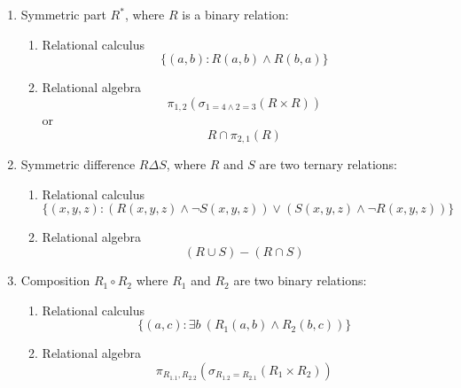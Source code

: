 \begin{enumerate}
  \item Symmetric part $R^*$, where $R$ is a binary relation:
  \begin{enumerate}
    \item Relational calculus
    \begin{equation*}
      \{(a,b) : R(a,b) \wedge R(b,a)\}
    \end{equation*}

    \item Relational algebra
    \begin{equation*}
      \pi_{1,2}(\sigma_{1 = 4 \land 2 = 3}(R \times R))
    \end{equation*}
    or
    \begin{equation*}
      R \cap \pi_{2,1}(R)
    \end{equation*}
  \end{enumerate}

  \item Symmetric difference $R \Delta S$, where $R$ and $S$ are two ternary relations:
  \begin{enumerate}
    \item Relational calculus
    \begin{equation*}
      \{(x,y,z) : (R(x,y,z) \land \neg S(x,y,z)) \lor (S(x,y,z) \land \neg R(x,y,z))\}
    \end{equation*}

    \item Relational algebra
    \begin{equation*}
      (R \cup S) - (R \cap S)
    \end{equation*}
  \end{enumerate}

  \item Composition $R_1 \circ R_2$ where $R_1$ and $R_2$ are two binary relations:
  \begin{enumerate}
    \item Relational calculus
    \begin{equation*}
      \{(a,c) : \exists b \: (R_1(a,b) \land R_2(b,c))\}
    \end{equation*}

    \item Relational algebra
    \begin{equation*}
      \pi_{R_1.1,R_2.2}(\sigma_{R_1.2 = R_2.1}(R_1 \times R_2))
    \end{equation*}
  \end{enumerate}
\end{enumerate}